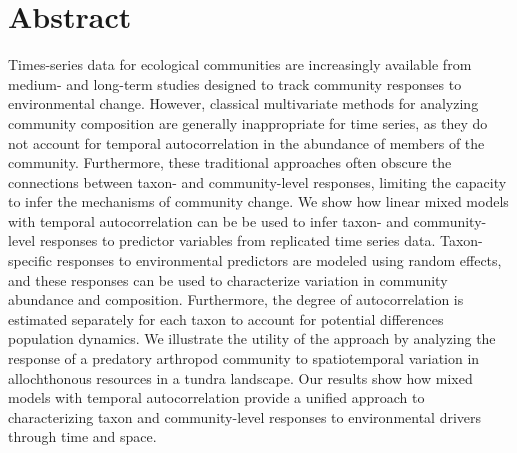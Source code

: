 
\section*{Abstract}

Times-series data for ecological communities are increasingly available
from medium- and long-term studies designed to track community responses
to environmental change. However, classical multivariate methods for
analyzing community composition are generally inappropriate for time series,
as they do not account for temporal autocorrelation
in the abundance of members of the community.
Furthermore, these traditional approaches often obscure the connections between
taxon- and community-level responses, limiting the capacity to
infer the mechanisms of community change.
We show how linear mixed models with temporal autocorrelation
can be be used to infer taxon- and community-level responses
to predictor variables from replicated time series data.
Taxon-specific responses to environmental predictors are modeled
using random effects, and these responses can be used to characterize
variation in community abundance and composition.
Furthermore, the degree of autocorrelation is
estimated separately for each taxon
to account for potential differences population dynamics.
We illustrate the utility of the approach
by analyzing the response of a predatory arthropod community to
spatiotemporal variation in allochthonous resources in a tundra landscape.
Our results show how mixed models with temporal autocorrelation provide
a unified approach to characterizing taxon and community-level
responses to environmental drivers through time and space.
